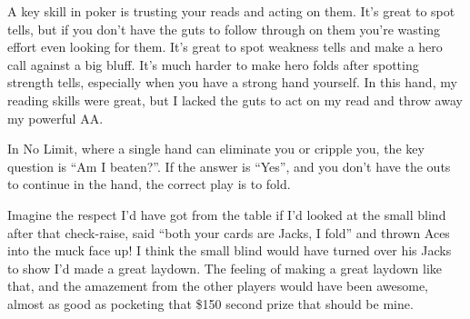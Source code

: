 A key skill in poker is trusting your reads and acting on them.
It's great to spot tells, but if you don't have the guts to follow
through on them you're wasting effort even looking for them. It's
great to spot weakness tells and make a hero call against a big bluff.
It's much harder to make hero folds after spotting strength tells,
especially when you have a strong hand yourself.
In this hand, my reading skills were great, but I lacked the guts to act
on my read and throw away my powerful AA.

In No Limit, where a single hand can eliminate you or cripple you, the key
question is ``Am I beaten?''. If the answer is ``Yes'', and you don't have
the outs to continue in the hand, the correct play is to fold.

Imagine the respect I'd have got from the table if I'd looked at the
small blind after that check-raise, said ``both your cards are
Jacks, I fold'' and thrown Aces into the muck face up! I think the
small blind would have turned over his Jacks to show I'd made a great
laydown. The feeling of making a great laydown like that,
and the amazement from the other players would have been awesome, almost as
good as pocketing that \$150 second prize that should be mine.

